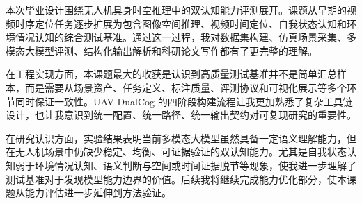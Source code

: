 
\begin{designsummary}
本次毕业设计围绕无人机具身时空推理中的双认知能力评测展开。课题从早期的视频时序定位任务逐步扩展为包含图像空间推理、视频时间定位、自我状态认知和环境情况认知的综合测试基准。通过这一过程，我对数据集构建、仿真场景采集、多模态大模型评测、结构化输出解析和科研论文写作都有了更完整的理解。

在工程实现方面，本课题最大的收获是认识到高质量测试基准并不是简单汇总样本，而是需要从场景资产、任务定义、标注质量、评测协议和可视化展示等多个环节同时保证一致性。UAV-DualCog 的四阶段构建流程让我更加熟悉了复杂工具链设计，也让我意识到统一配置、统一路径、统一输出契约对可复现研究的重要性。

在研究认识方面，实验结果表明当前多模态大模型虽然具备一定语义理解能力，但在无人机场景中仍缺少稳定、均衡、可证据验证的双认知能力。尤其是自我状态认知弱于环境情况认知、语义判断与空间或时间证据脱节等现象，使我进一步理解了测试基准对于发现模型能力边界的价值。后续我将继续完成能力优化部分，使本课题从能力评估进一步延伸到方法验证。
\end{designsummary}
